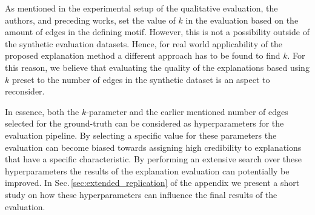 As mentioned in the experimental setup of the qualitative evaluation, the authors, and preceding works, set the value of $k$ in the evaluation based on the amount of edges in the defining motif. However, this is not a possibility outside of the synthetic evaluation datasets. Hence, for real world applicability of the proposed explanation method a different approach has to be found to find $k$. For this reason, we believe that evaluating the quality of the explanations based using $k$ preset to the number of edges in the synthetic dataset is an aspect to reconsider. 

In essence, both the $k$-parameter and the earlier mentioned number of edges selected for the ground-truth can be considered as hyperparameters for the evaluation pipeline. By selecting a specific value for these parameters the evaluation can become biased towards assigning high credibility to explanations that have a specific characteristic. By performing an extensive search over these hyperparameters the results of the explanation evaluation can potentially be improved. In Sec.\,\ref{sec:extended_replication} of the appendix we present a short study on how these hyperparameters can influence the final results of the evaluation. 




